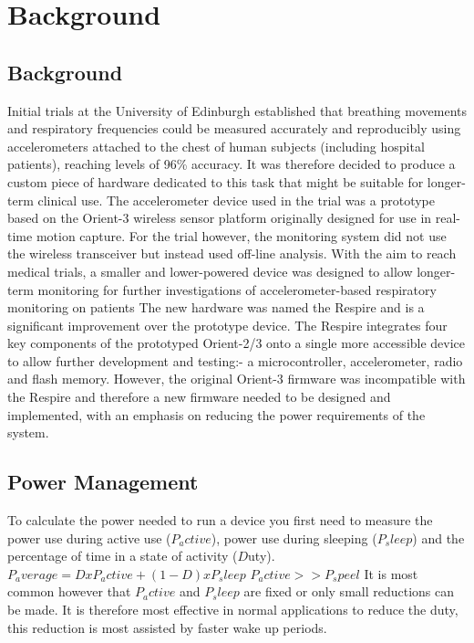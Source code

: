 
\chapter{Background}

\section{Background}
Initial trials at the University of Edinburgh established that breathing movements and respiratory
frequencies could be measured accurately and reproducibly using accelerometers attached to the
chest of human subjects (including hospital patients), reaching levels of 96\% accuracy\cite{BatesLingMannArvind2010}.
It was therefore decided to produce a custom piece of hardware dedicated
to this task that might be suitable for longer-term clinical use. The accelerometer device used in the
trial was a prototype based on the Orient-3 wireless sensor platform originally designed for use in
real-time motion capture. For the trial however, the monitoring system did not use the wireless
transceiver but instead used off-line analysis.
With the aim to reach medical trials, a smaller and lower-powered device was designed to allow
longer-term monitoring for further investigations of accelerometer-based respiratory monitoring on
patients The new hardware was named the Respire and is a significant improvement over the
prototype device. The Respire integrates four key components of the prototyped Orient-2/3 onto a
single more accessible device to allow further development and testing:- a microcontroller,
accelerometer, radio and flash memory. However, the original Orient-3 firmware was incompatible
with the Respire and therefore a new firmware needed to be designed and implemented, with an
emphasis on reducing the power requirements of the system.

\section{Power Management}
To calculate the power needed to run a device you first need to measure the power use during
active use ($P_active$), power use during sleeping ($P_sleep$) and the percentage of time in a state of
activity ($D$uty).
$P_average = D x P_active + (1-D) x P_sleep$
$P_active >> P_speel$
It is most common however that $P_active$ and $P_sleep$ are fixed or only small reductions can be
made. It is therefore most effective in normal applications to reduce the duty, this reduction is most
assisted by faster wake up periods.


